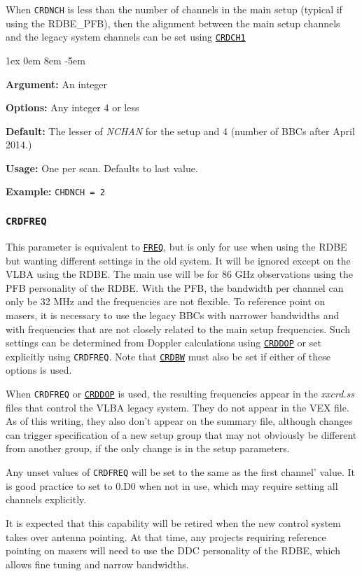 \documentclass{report}
\newcommand{\rcwbox}[5]{
  \begin{list}{}{\parsep 1ex  \itemsep 0em
                 \leftmargin 8em  \itemindent -5em }
    \item {\bf Argument:} #1
    \item {\bf Options:}  #2
    \item {\bf Default:}  #3
    \item {\bf Usage:}    #4
    \item {\bf Example:}  #5
  \end{list}
}
\begin{document}
When {\tt CRDNCH} is less than the number of channels in the main setup
(typical if using the RDBE\_PFB), then the alignment between the main
setup channels and the legacy system channels can be set using
{\hyperref[MP:CRDCH1]{{\tt CRDCH1}}}

\rcwbox
{An integer}
{Any integer 4 or less}
{The lesser of {\sl NCHAN} for the setup and 4 (number of BBCs after 
April 2014.)}
{One per scan.  Defaults to last value.}
{{\tt CHDNCH = 2}}

\subsubsection{\label{MP:CRDFREQ}{\tt CRDFREQ}}

This parameter is equivalent to 
{\hyperref[MP:FREQ]{{\tt FREQ}}}, but is
only for use when using the RDBE but wanting different settings in the
old system.  It will be ignored except on the VLBA using the RDBE.
The main use will be for 86 GHz observations using the PFB personality
of the RDBE.  With the PFB, the bandwidth per channel can only be 32
MHz and the frequencies are not flexible.  To reference point on
masers, it is necessary to use the legacy BBCs with narrower
bandwidths and with frequencies that are not closely related to the
main setup frequencies.  Such settings can be determined from Doppler
calculations using 
{\hyperref[MP:CRDDOP]{{\tt CRDDOP}}} or set explicitly
using {\tt CRDFREQ}.  Note that 
{\hyperref[MP:CRDBW]{{\tt CRDBW}}} must
also be set if either of these options is used.

When {\tt CRDFREQ} or 
{\hyperref[MP:CRDDOP]{{\tt CRDDOP}}} is used, the
resulting frequencies appear in the {\sl xxcrd.ss} files that control
the VLBA legacy system.  They do not appear in the VEX file.  As of
this writing, they also don't appear on the summary file, although
changes can trigger specification of a new setup group that may not
obviously be different from another group, if the only change is 
in the setup parameters.

Any unset values of {\tt CRDFREQ} will be set to the same as the first
channel' value.  It is good practice to set to 0.D0 when not in use,
which may require setting all channels explicitly.

It is expected that this capability will be retired when the new
control system takes over antenna pointing.  At that time, any projects
requiring reference pointing on masers will need to use the DDC
personality of the RDBE, which allows fine tuning and narrow bandwidths.
\end{document}
